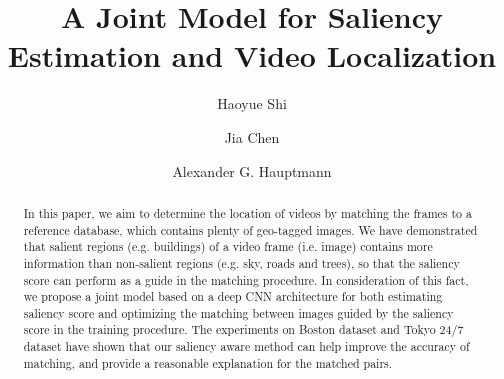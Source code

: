 \documentclass[sigconf, review=true, anonymous=true]{acmart}
\begin{document}
\title{A Joint Model for Saliency Estimation and Video Localization}

\author{Haoyue Shi}

\author{Jia Chen}

\author{Alexander G. Hauptmann}


\begin{abstract}
\par
In this paper, we aim to determine the location of videos by matching the frames to a reference database, which contains plenty of geo-tagged images. We have demonstrated that salient regions (e.g. buildings) of a video frame (i.e. image) contains more information than non-salient regions (e.g. sky, roads and trees), so that the saliency score can perform as a guide in the matching procedure. In consideration of this fact, we propose a joint model based on a deep CNN architecture for both estimating saliency score and optimizing the matching between images guided by the saliency score in the training procedure. The experiments on Boston dataset and Tokyo 24/7 dataset have shown that our saliency aware method can help improve the accuracy of matching, and provide a reasonable explanation for the matched pairs. 
\end{abstract}




\maketitle




 
\end{document}
